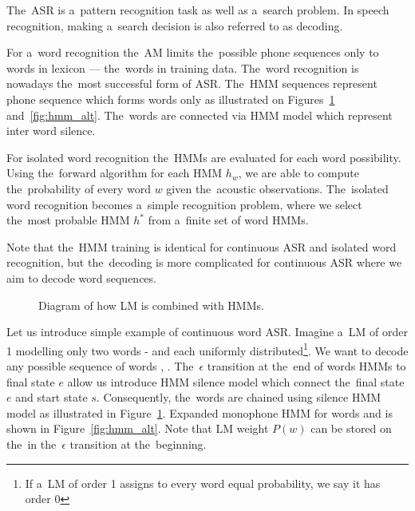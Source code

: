 The~\ac{ASR} is a~pattern recognition task as well as a~search problem.
In speech recognition, making a~search decision is also referred to as decoding.\cite{huang2001spoken}

For a~word recognition the~\ac{AM} limits the~possible phone sequences only to words in lexicon --- the~words in training data.
The~word recognition is nowadays the~most successful form of \ac{ASR}.
The~\ac{HMM} sequences represent phone sequence which forms words only as illustrated on Figures~\ref{fig:hmm_lm} and~\ref{fig:hmm_alt}.
The~words are connected via \ac{HMM} model which represent inter word silence.

For isolated word recognition the~\acp{HMM} are evaluated for each word possibility.
Using the~forward algorithm for each \ac{HMM} $h_w$, we are able to compute the~probability of every word $w$ given the~acoustic observations.
The~isolated word recognition becomes a~simple recognition problem, where we select the~most probable \ac{HMM} $h^*$ from a~finite set of word \acp{HMM}.

Note that the~\ac{HMM} training is identical for continuous \ac{ASR} and isolated word recognition,
but the~decoding is more complicated for continuous \ac{ASR} where we aim to decode word sequences.

\begin{figure}[!htp]
    \begin{center}
        
        \caption{Diagram of how \ac{LM} is combined with \acp{HMM}.}
        \label{fig:hmm_lm} 
    \end{center}
\end{figure}

Let us introduce simple example of continuous word \ac{ASR}.
Imagine a~\ac{LM} of order 1 modelling only two words -  and  each uniformly distributed\footnote{If a~\ac{LM} of order 1 assigns to every word equal probability, we say it has order 0}.
We want to decode any possible sequence of words , . 
The~$\epsilon$ transition at the~end of words \acp{HMM} to final state $e$ allow us introduce \ac{HMM} silence model which connect the~final state $e$ and start state $s$. 
Consequently, the~words are chained using silence \ac{HMM} model as illustrated in Figure~\ref{fig:hmm_lm}.
Expanded monophone \ac{HMM} for words  and  is shown in Figure~\ref{fig:hmm_alt}.
Note that \ac{LM} weight $P(w)$ can be stored on the~in the~$\epsilon$ transition at the~beginning.

